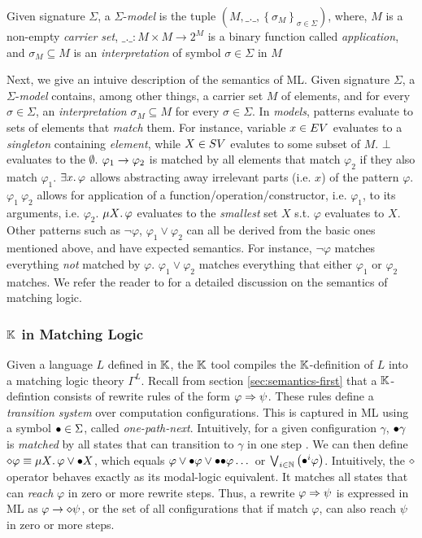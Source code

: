 Given signature $\Sigma$, a $\Sigma$-\emph{model} is the tuple $\left(M, \_.\_,
\left\{\sigma_{M}\right\}_{\sigma \in \Sigma}\right)$, where,
$M$ is a non-empty \emph{carrier set}, $\_.\_: M \times M \to 2^M$
  is a binary function called \emph{application}, and $\sigma_{M} \subseteq M$ is an
  \emph{interpretation} of symbol $\sigma \in \Sigma$ in $M$

Next, we give an intuive description of the semantics of ML.
Given signature $\Sigma$, a $\Sigma$-\emph{model} contains, among other things,
a carrier set $M$ of elements, and for every $\sigma \in \Sigma$, an
\emph{interpretation}  $\sigma_{M} \subseteq M$ for every $\sigma \in \Sigma$.
In \emph{models}, patterns evaluate to sets of elements that \emph{match} them.
For instance, variable $x \in EV$ evaluates to a \emph{singleton}
containing \emph{element}, while $X \in SV$ evalutes to some subset of $M$. $\bot$
evaluates to the $\emptyset$.
$\varphi_1 \to \varphi_2$ is matched by all elements that match $\varphi_2$
if they also match $\varphi_1$. $\exists x \mathord{.\,} \varphi$ allows abstracting
away irrelevant parts (i.e. $x$) of the pattern $\varphi$. $\varphi_1\
\varphi_2$ allows for application of a function/operation/constructor,
i.e. $\varphi_1$, to its arguments, i.e. $\varphi_2$. $\mu X \mathord{.\,} \varphi$
evaluates to the \emph{smallest} set $X$ s.t. $\varphi$ evaluates to $X$.
Other patterns such as $\neg \varphi$, $\varphi_1 \vee \varphi_2$ can all be
derived from the basic ones mentioned above, and have expected semantics.
For instance, $\neg \varphi$ matches everything \emph{not} matched by
$\varphi$. $\varphi_1 \vee \varphi_2$ matches everything that either
$\varphi_1$ or $\varphi_2$ matches. We refer the reader to \cite{ChenTR20}
for a detailed discussion on the semantics of matching logic.

\subsubsection{$\mathbb{K}$ in Matching Logic}

Given a language $L$ defined in $\mathbb{K}$, the $\mathbb{K}$ tool compiles
the $\mathbb{K}$-definition of $L$ into a matching logic theory $\Gamma^L$.
Recall from section \ref{sec:semantics-first} that a $\mathbb{K}$-defintion
consists of rewrite rules of the form $\varphi \Rightarrow \psi$. These rules
  define a \emph{transition system} over computation configurations.
This is captured in ML using a symbol ${\bullet} \in \Sigma$, called
\emph{one-path-next}. Intuitively, for a given configuration $\gamma$, ${\bullet}\gamma$
is \emph{matched} by all states that can transition to $\gamma$ in one step \cite{ChenTR20}.
We can then define $\diamond \varphi \equiv \mu X \mathord{.\,} \varphi \lor {\bullet} X$,
  which equals $\varphi \vee {\bullet}\varphi \vee {\bullet}{\bullet}\varphi \dots$ or $\bigvee_{i \in
  \mathbb{N}}\left({\bullet}^{i}\varphi\right)$.
Intuitively, the $\diamond$ operator behaves exactly
as its modal-logic equivalent. It matches all states that can \emph{reach} $\varphi$ in zero or more rewrite steps.
Thus, a rewrite $\varphi \Rightarrow \psi$ is expressed in ML as $\varphi \to \diamond \psi$, or
the set of all configurations that if match $\varphi$, can also reach $\psi$ in zero or more steps.




